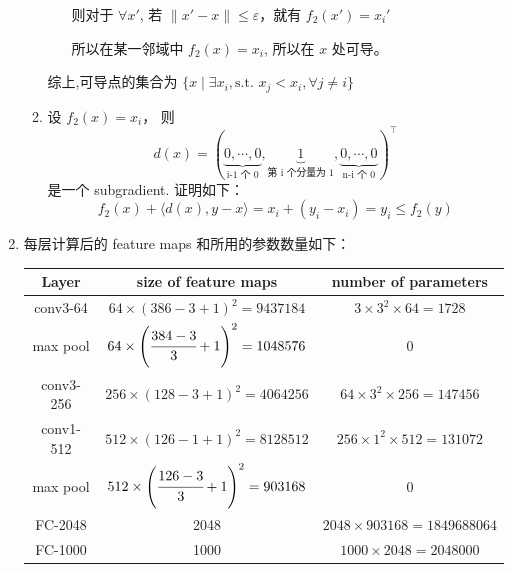 \documentclass[11pt,letter,notitlepage]{article}
\begin{document}
\begin{solution}
\begin{enumerate}
\begin{enumerate}
\begin{enumerate}
				                  则对于 $\forall x'$, 若 $\|x'-x\|\leq\varepsilon$，就有 $f_2(x')=x_i'$

				                  所以在某一邻域中 $f_2(x)=x_i$, 所以在 $x$ 处可导。
			            \end{enumerate}
			            综上,可导点的集合为 $\{ x \mid \exists x_i,\text{s.t. }x_j < x_i, \forall j\neq i\}$
			      \item 设 $f_2(x)=x_i$， 则
			            $$d(x)=(\underbrace{0,\cdots,0}_{\text{i-1 个 0}},\underbrace{1}_{\text{第 i 个分量为 1}},\underbrace{0,\cdots,0}_{\text{n-i 个 0}})^\top$$
			            是一个 subgradient. 证明如下：
			            $$f_2(x)+\langle d(x),y-x \rangle=x_i+(y_i-x_i)=y_i \leq f_2(y)$$
		      \end{enumerate}
		\item 每层计算后的 feature maps 和所用的参数数量如下： \\
		      \begin{center}
			      \begin{tabular}{|c|c|c|}
				      \hline
				      \textbf{Layer} & \textbf{size of feature maps}                       & \textbf{number of parameters}  \\
				      \hline
				      conv3-64       & $64\times(386-3+1)^2=9437184$                       & $3\times3^2\times64=1728$      \\
				      \hline
				      max pool       & $64\times\left(\cfrac{384-3}{3}+1\right)^2=1048576$ & 0                              \\
				      \hline
				      conv3-256      & $256\times(128-3+1)^2=4064256$                      & $64\times3^2\times256=147456$  \\
				      \hline
				      conv1-512      & $512\times(126-1+1)^2=8128512$                      & $256\times1^2\times512=131072$ \\
				      \hline
				      max pool       & $512\times\left(\cfrac{126-3}{3}+1\right)^2=903168$ & 0                              \\
				      \hline
				      FC-2048        & 2048                                                & $2048\times903168=1849688064$  \\
				      \hline
				      FC-1000        & 1000                                                & $1000\times2048=2048000$       \\
				      \hline
			      \end{tabular}
		      \end{center}
	\end{enumerate}
\end{solution}
\end{document}
